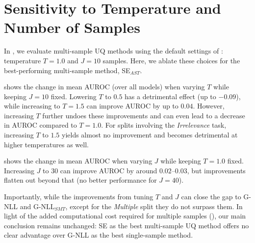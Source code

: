 \section{Sensitivity to Temperature and Number of Samples}
\label{app:sensitivity}

In , we evaluate multi-sample UQ methods using the default settings of \citet{farquhar2024detec}: temperature $T\!=\!1.0$ and $J\!=\!10$ samples. Here, we ablate these choices for the best-performing multi-sample method, SE$_{AST}$.

 shows the change in mean AUROC (over all models) when varying $T$ while keeping $J\!=\!10$ fixed. Lowering $T$ to $0.5$ has a detrimental effect (up to $-0.09$), while increasing to $T\!=\!1.5$ can improve AUROC by up to $0.04$. However, increasing $T$ further undoes these improvements and can even lead to a decrease in AUROC compared to $T\!=\!1.0$. For splits involving the \emph{Irrelevance} task, increasing $T$ to $1.5$ yields almost no improvement and becomes detrimental at higher temperatures as well.

 shows the change in mean AUROC when varying $J$ while keeping $T\!=\!1.0$ fixed. Increasing $J$ to $30$ can improve AUROC by around $0.02$--$0.03$, but improvements flatten out beyond that (no better performance for $J\!=\!40$).

Importantly, while the improvements from tuning $T$ and $J$ can close the gap to G-NLL and G-NLL$_{SMT}$, except for the \emph{Multiple} split they do not surpass them. In light of the added computational cost required for multiple samples (), our main conclusion remains unchanged: SE as the best multi-sample UQ method offers no clear advantage over G-NLL as the best single-sample method.


